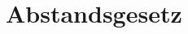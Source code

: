 \documentclass[../protokoll.tex]{subfiles}
\begin{document}
\section{Abstandsgesetz}\label{sec:Abstandsgesetz}
 
\end{document}
